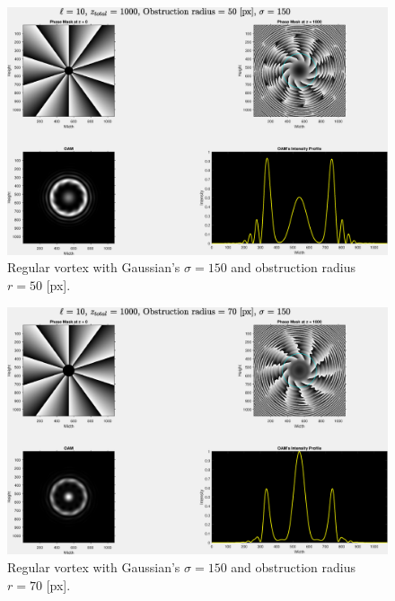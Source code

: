 \begin{figure}[htbp]
    \centering
    \includegraphics[width=12cm]{images/Appendices/Additional_Results/Sigma_150/type=0_r=50_zi=0_zf=1000.eps}
    \caption{Regular vortex with Gaussian's $\sigma = 150$ and obstruction radius $r=50$ [px].}
    \label{fig:reg_s=150_r=50}
\end{figure}

\begin{figure}[htbp]
    \centering
    \includegraphics[width=12cm]{images/Appendices/Additional_Results/Sigma_150/type=0_r=70_zi=0_zf=1000.eps}
    \caption{Regular vortex with Gaussian's $\sigma = 150$ and obstruction radius $r=70$ [px].}
    \label{fig:reg_s=150_r=70}
\end{figure}

